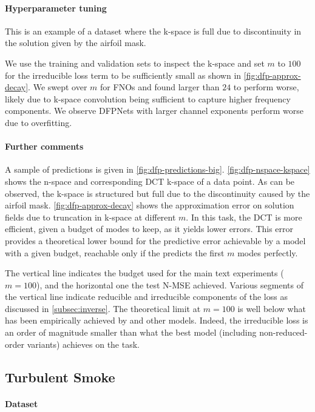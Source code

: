 \paragraph{Hyperparameter tuning}
%
This is an example of a dataset where the k-space is full due to discontinuity in the solution given by the airfoil mask.

We use the training and validation sets to inspect the k-space and set $m$ to $100$ for the irreducible loss term to be sufficiently small as shown in \cref{fig:dfp-approx-decay}. We swept over $m$ for FNOs and found larger than $24$ to perform worse, likely due to k-space convolution being sufficient to capture higher frequency components. We observe DFPNets with larger channel exponents perform worse due to overfitting. 

\paragraph{Further comments}

A sample of predictions is given in \cref{fig:dfp-predictions-big}. \cref{fig:dfp-nspace-kspace} shows the n-space and corresponding DCT k-space of a data point. As can be observed, the k-space is structured but full due to the discontinuity caused by the airfoil mask. \cref{fig:dfp-approx-decay} shows the approximation error on solution fields due to truncation in k-space at different $m$. In this task, the DCT is more efficient, given a budget of modes to keep, as it yields lower errors. This error provides a theoretical lower bound for the predictive error achievable by a \ourmethod{} model with a given budget, reachable only if the \ourmethod{} predicts the first $m$ modes perfectly.

The vertical line indicates the budget used for the main text \ourmethod{} experiments ($m=100$), and the horizontal one the test N-MSE achieved. Various segments of the vertical line indicate reducible and irreducible components of the loss as discussed in \cref{subsec:inverse}. The theoretical limit at $m=100$ is well below what has been empirically achieved by \ourmethod{} and other models. Indeed, the irreducible loss is an order of magnitude smaller than what the best model (including non-reduced-order variants) achieves on the task. 


\subsection{Turbulent Smoke}\label{asec:exp_sf}
%
\paragraph{Dataset}


